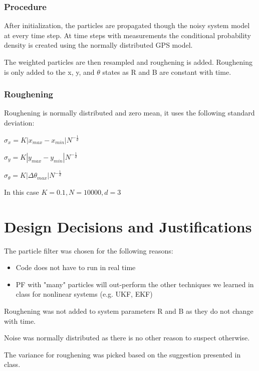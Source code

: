 \documentclass[twoside,twocolumn]{article}
\begin{document}
\subsubsection{Procedure}

After initialization, the particles are propagated though the noisy system model at every time step. At time steps with measurements the conditional probability density is created using the normally distributed GPS model.

The weighted particles are then resampled and roughening is added. Roughening is only added to the x, y, and $\theta$ states as R and B are constant with time.

\subsubsection{Roughening}

Roughening is normally distributed and zero mean, it uses the following standard deviation:

\begin{center}
$\sigma_x = K |x_{max} - x_{min}| N^{-\frac{1}{d}}$

$\sigma_y = K |y_{max} - y_{min}| N^{-\frac{1}{d}}$

$\sigma_\theta = K |\Delta\theta_{max}| N^{-\frac{1}{d}}$
\end{center}

In this case $K = 0.1, N = 10000, d = 3$

\section{Design Decisions and Justifications}

The particle filter was chosen for the following reasons:
\begin{itemize}
\item Code does not have to run in real time
\item PF with "many" particles will out-perform the other techniques we learned in class for nonlinear systems (e.g. UKF, EKF)
\end{itemize}

Roughening was not added to system parameters R and B as they do not change with time.

Noise was normally distributed as there is no other reason to suspect otherwise.

The variance for roughening was picked based on the suggestion presented in class.
\end{document}
